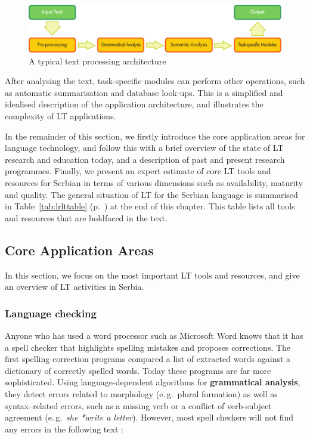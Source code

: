 \begin{multicols}{2}
\begin{figure}[tb]
  \center
  \includegraphics[width=\textwidth]{../_media/english/text_processing_app_architecture}
  \caption{A typical text processing architecture}
  \label{fig:textprocessingarch_en}
\end{figure}

After analysing the text, task-specific modules can perform other operations, such as automatic summarisation and database look-ups. This is a simplified and idealised description of the application architecture, and illustrates the complexity of LT applications. 

In the remainder of this section, we firstly introduce the core application areas for language technology, and follow this with a brief overview of the state of LT research and education today, and a description of past and present research programmes. Finally, we present an expert estimate of core LT tools and resources for Serbian in terms of various dimensions such as availability, maturity and quality. The general situation of LT for the Serbian language is summarised in
Table~\ref{tab:lrlttable} (p.~\pageref{tab:lrlttable}) at the end of this chapter. This table lists all tools and
resources that are boldfaced in the text. 
 
 

 \subsection {Core Application Areas}
   
In this section, we focus on the most important LT tools and resources, and give an overview of LT activities in Serbia.   

 \subsubsection {Language checking}
   
 Anyone who has used a word processor such as Microsoft Word knows that it has a spell checker that highlights spelling mistakes and proposes corrections. The first spelling correction programs compared a list of extracted words against a dictionary of correctly spelled words. Today these programs are far more sophisticated. Using language-dependent algorithms for \textbf{grammatical analysis}, they detect errors related to morphology (e.\,g.~plural formation) as well as syntax–related errors, such as a missing verb or a conflict of verb-subject agreement (e.\,g.~\textit{she *write a letter}). However, most spell checkers will not find any errors in the following text \cite{ZAR}:


\end{multicols}
